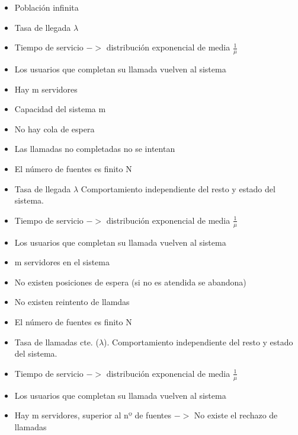 \vfill\null
\columnbreak
{}
\begin{minipage}{.22\textwidth}
	\begin{itemize}[leftmargin=*]
		\item Población infinita
		\item Tasa de llegada $\lambda$
		\item Tiempo de servicio $->$ distribución exponencial de media $\frac{1}{\mu}$
		\item Los usuarios que completan su llamada vuelven al sistema
		\item Hay m servidores
		\item Capacidad del sistema m
		\item No hay cola de espera
		\item Las llamadas no completadas no se intentan
	\end{itemize}
\end{minipage}


\begin{minipage}{.22\textwidth}
	\begin{itemize}[leftmargin=*]
		\item El número de fuentes es finito N
		\item Tasa de llegada $\lambda$ Comportamiento independiente del resto y estado del sistema.
		\item Tiempo de servicio $->$ distribución exponencial de media $\frac{1}{\mu}$
		\item Los usuarios que completan su llamada vuelven al sistema
		\item m servidores en el sistema
		\item No existen posiciones de espera (si no es atendida se abandona)
		\item No existen reintento de llamdas
	\end{itemize}
\end{minipage}

\begin{minipage}{.22\textwidth}
	\begin{itemize}[leftmargin=*]
		\item El número de fuentes es finito N
		\item Tasa de llamadas cte. ($\lambda$). Comportamiento independiente del resto y estado del sistema.
		\item Tiempo de servicio $->$ distribución exponencial de media $\frac{1}{\mu}$
		\item Los usuarios que completan su llamada vuelven al sistema
		\item Hay m servidores, superior al nº de fuentes $->$ No existe el rechazo de llamadas
	\end{itemize}
\end{minipage}